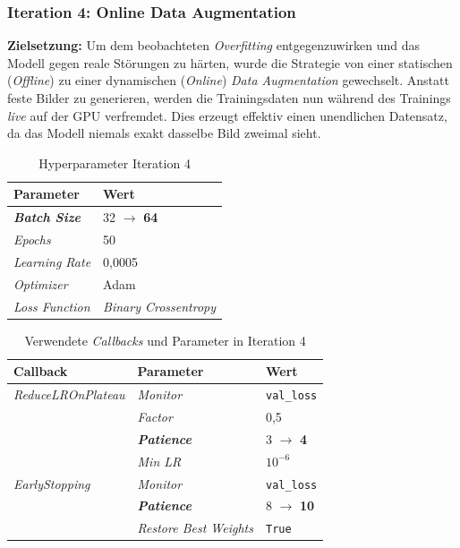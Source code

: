 \documentclass[
    a4paper,        %
    11pt,           %
    ngerman,        %
    parskip=half,   %
    listof=totoc,   %
    bibliography=totoc %
]{scrartcl}
\begin{document}
\subsubsection{Iteration 4: Online Data Augmentation} \label{subsubsec:iter4}

\textbf{Zielsetzung:} Um dem beobachteten \textit{Overfitting} entgegenzuwirken und das Modell gegen reale Störungen zu härten, wurde die Strategie von einer statischen (\textit{Offline}) zu einer dynamischen (\textit{Online}) \textit{Data Augmentation} gewechselt. Anstatt feste Bilder zu generieren, werden die Trainingsdaten nun während des Trainings \textit{live} auf der GPU verfremdet. Dies erzeugt effektiv einen unendlichen Datensatz, da das Modell niemals exakt dasselbe Bild zweimal sieht.

\begin{table}[H]
    \centering
    \caption{Hyperparameter Iteration 4}
    \label{tab:hyperparams_iter4}
    \begin{tabular}{ll}
        \toprule
        \textbf{Parameter} & \textbf{Wert} \\
        \midrule
        \textbf{\textit{Batch Size}} & 32 $\rightarrow$ \textbf{64} \\
        \textit{Epochs} & 50 \\
        \textit{Learning Rate} & 0,0005 \\
        \textit{Optimizer} & Adam \\
        \textit{Loss Function} & \textit{Binary Crossentropy} \\
        \bottomrule
    \end{tabular}
\end{table}

\begin{table}[H]
    \centering
    \caption{Verwendete \textit{Callbacks} und Parameter in Iteration 4}
    \label{tab:callbacks_iter4}
    \begin{tabular}{lll}
        \toprule
        \textbf{Callback} & \textbf{Parameter} & \textbf{Wert} \\
        \midrule
        \textit{ReduceLROnPlateau} & \textit{Monitor} & \texttt{val\_loss} \\
                          & \textit{Factor} & 0,5 \\
                          & \textbf{\textit{Patience}} & 3 $\rightarrow$ \textbf{4} \\
                          & \textit{Min LR} & $10^{-6}$ \\
        \midrule
        \textit{EarlyStopping}     & \textit{Monitor} & \texttt{val\_loss} \\
                          & \textbf{\textit{Patience}} & 8 $\rightarrow$ \textbf{10} \\
                          & \textit{Restore Best Weights} & \texttt{True} \\
        \bottomrule
    \end{tabular}
\end{table}
\end{document}
